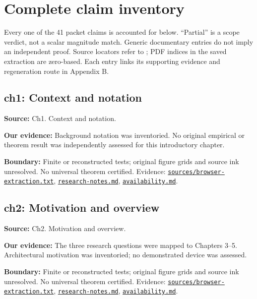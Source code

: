 \documentclass[11pt]{article}
\begin{document}
\appendix
\section{Complete claim inventory}
Every one of the 41 packet claims is accounted for below. ``Partial'' is a scope verdict, not a scalar magnitude match. Generic documentary entries do not imply an independent proof. Source locators refer to \citet{quintavalle2022}; PDF indices in the saved extraction are zero-based. Each entry links its supporting evidence and regeneration route in Appendix B.
\subsection{ch1: Context and notation}
\label{claim:ch1}
\textbf{Source:} Ch1. Context and notation.

\textbf{Our evidence:} Background notation was inventoried. No original empirical or theorem result was independently assessed for this introductory chapter.

\textbf{Boundary:} Finite or reconstructed tests; original figure grids and source ink unresolved. No universal theorem certified. Evidence: \href{https://github.com/alectionary/vibe-math/blob/master/formalization/quintavalle-hgp/sources/browser-extraction.txt}{\nolinkurl{sources/browser-extraction.txt}}, \href{https://github.com/alectionary/vibe-math/blob/master/formalization/quintavalle-hgp/research-notes.md}{\nolinkurl{research-notes.md}}, \href{https://github.com/alectionary/vibe-math/blob/master/formalization/quintavalle-hgp/availability.md}{\nolinkurl{availability.md}}.
\subsection{ch2: Motivation and overview}
\label{claim:ch2}
\textbf{Source:} Ch2. Motivation and overview.

\textbf{Our evidence:} The three research questions were mapped to Chapters 3--5. Architectural motivation was inventoried; no demonstrated device was assessed.

\textbf{Boundary:} Finite or reconstructed tests; original figure grids and source ink unresolved. No universal theorem certified. Evidence: \href{https://github.com/alectionary/vibe-math/blob/master/formalization/quintavalle-hgp/sources/browser-extraction.txt}{\nolinkurl{sources/browser-extraction.txt}}, \href{https://github.com/alectionary/vibe-math/blob/master/formalization/quintavalle-hgp/research-notes.md}{\nolinkurl{research-notes.md}}, \href{https://github.com/alectionary/vibe-math/blob/master/formalization/quintavalle-hgp/availability.md}{\nolinkurl{availability.md}}.
\end{document}
